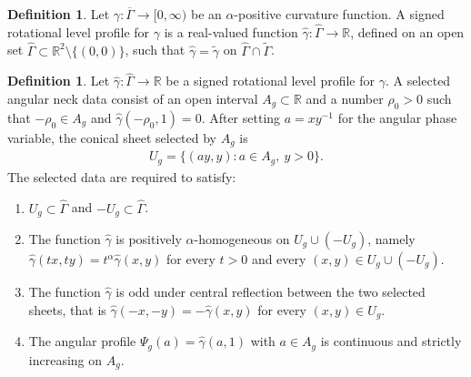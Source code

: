 \documentclass{amsart}
\theoremstyle{plain}
\theoremstyle{mainintrothm}
\theoremstyle{definition}
\newtheorem{definition}[theorem]{Definition}
\begin{document}
	\begin{definition}
		\label{def:signed-rotational-extension}
		Let $\gamma:\overline\Gamma\to[0,\infty)$ be an $\alpha$-positive
		curvature function.  A signed rotational level profile for $\gamma$ is a
		real-valued function
		$\widehat\gamma:\widehat\Gamma\to\mathbb R$, defined on an open set
		$\widehat\Gamma\subset\mathbb R^2\setminus\{(0,0)\}$, such that
		$\widehat\gamma=\widetilde\gamma$ on
		$\widehat\Gamma\cap\widetilde\Gamma$.
	\end{definition}

	\begin{definition}
		\label{def:selected-signed-neck-datum}
		Let $\widehat\gamma:\widehat\Gamma\to\mathbb R$ be a signed rotational
		level profile for $\gamma$.  A selected angular neck data consist of an open
		interval $A_g\subset\mathbb R$ and a number $\rho_0>0$ such that
		$-\rho_0\in A_g$ and $\widehat\gamma(-\rho_0,1)=0$.
		After setting $a=xy^{-1}$ for the angular phase variable, the conical
		sheet selected by $A_g$ is
		\begin{align*}
			U_g
			=
			\{(ay,y):a\in A_g,\ y>0\}.
		\end{align*}
		The selected data are required to satisfy:
		\begin{enumerate}[label=\textup{(H\arabic*)}, ref=H\arabic*]
			\item \label{hyp:signed-domain}
			$U_g\subset\widehat\Gamma$ and $-U_g\subset\widehat\Gamma$.


			\item \label{hyp:signed-homogeneity}
			The function $\widehat\gamma$ is positively $\alpha$-homogeneous on
			$U_g\cup(-U_g)$, namely $\widehat\gamma(tx,ty)=t^\alpha\widehat\gamma(x,y)$
			for every $t>0$ and every $(x,y)\in U_g\cup(-U_g)$.

			\item \label{hyp:signed-oddness}
			The function $\widehat\gamma$ is odd under central reflection between
			the two selected sheets, that is  $\widehat\gamma(-x,-y)=-\widehat\gamma(x,y)$ for every $(x,y)\in U_g$.

			\item \label{hyp:signed-angular-monotonicity}
			The angular profile $\Psi_g(a)=\widehat\gamma(a,1)$ with $a\in A_g$ is continuous and strictly increasing on $A_g$.
		\end{enumerate}


	\end{definition}
\end{document}
